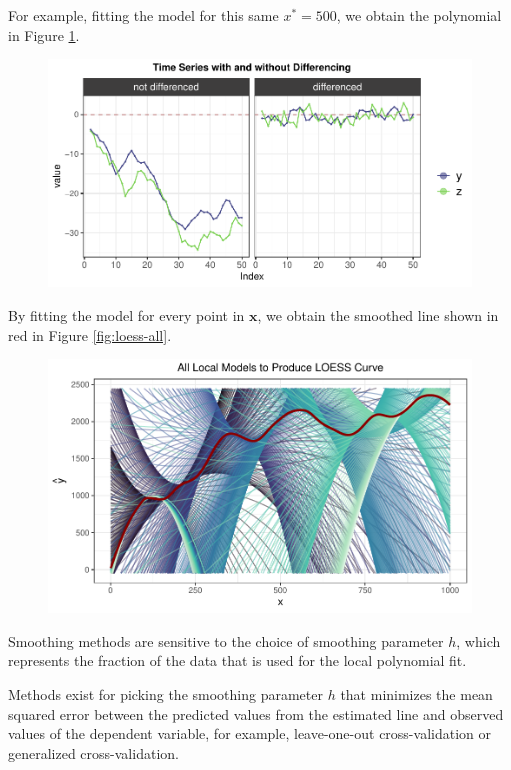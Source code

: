 \documentclass[12pt,twoside]{smiththesis}
\begin{document}
For example, fitting the model for this same \(x^*=500\), we obtain the polynomial in Figure \ref{fig:ex-poly}.
\begin{figure}
\centering
\includegraphics{thesis_files/figure-latex/unnamed-chunk-24-1.pdf}
\caption{\label{fig:unnamed-chunk-24}\label{fig:ex-poly}}
\end{figure}
By fitting the model for every point in \(\mathbf x\), we obtain the smoothed line shown in red in Figure \ref{fig:loess-all}.
\begin{figure}
\centering
\includegraphics{thesis_files/figure-latex/loess-all-1.pdf}
\caption{\label{fig:loess-all}\label{loess-all}}
\end{figure}
Smoothing methods are sensitive to the choice of smoothing parameter \(h\), which represents the fraction of the data that is used for the local polynomial fit.

Methods exist for picking the smoothing parameter \(h\) that minimizes the mean squared error between the predicted values from the estimated line and observed values of the dependent variable, for example, leave-one-out cross-validation or generalized cross-validation.
\end{document}
